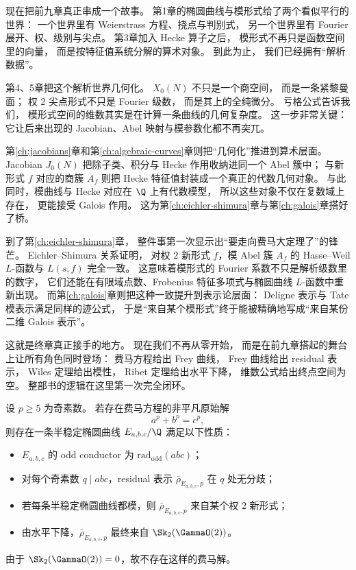 

现在把前九章真正串成一个故事。
第1章的椭圆曲线与模形式给了两个看似平行的世界：
一个世界里有 Weierstrass 方程、挠点与判别式，
另一个世界里有 Fourier 展开、权、级别与尖点。
第3章加入 Hecke 算子之后，
模形式不再只是函数空间里的向量，
而是按特征值系统分解的算术对象。
到此为止，
我们已经拥有“解析数据”。

第4、5章把这个解析世界几何化。
$X_0(N)$ 不只是一个商空间，
而是一条紧黎曼面；
权 $2$ 尖点形式不只是 Fourier 级数，
而是其上的全纯微分。
亏格公式告诉我们，
模形式空间的维数其实是在计算一条曲线的几何复杂度。
这一步非常关键：
它让后来出现的 Jacobian、Abel 映射与模参数化都不再突兀。

第\ref{ch:jacobians}章和第\ref{ch:algebraic-curves}章则把“几何化”推进到算术层面。
Jacobian $J_0(N)$ 把除子类、积分与 Hecke 作用收纳进同一个 Abel 簇中；
与新形式 $f$ 对应的商簇 $A_f$ 则把 Hecke 特征值封装成一个真正的代数几何对象。
与此同时，模曲线与 Hecke 对应在 $\Q$ 上有代数模型，
所以这些对象不仅在复数域上存在，
更能接受 Galois 作用。
这为第\ref{ch:eichler-shimura}章与第\ref{ch:galois}章搭好了桥。

到了第\ref{ch:eichler-shimura}章，
整件事第一次显示出“要走向费马大定理了”的锋芒。
Eichler--Shimura 关系证明，
对权 $2$ 新形式 $f$，模 Abel 簇 $A_f$ 的 Hasse--Weil $L$-函数与 $L(s,f)$ 完全一致。
这意味着模形式的 Fourier 系数不只是解析级数里的数字，
它们还能在有限域点数、Frobenius 特征多项式与椭圆曲线 $L$-函数中重新出现。
而第\ref{ch:galois}章则把这种一致提升到表示论层面：
Deligne 表示与 Tate 模表示满足同样的迹公式，
于是“来自某个模形式”终于能被精确地写成“来自某份二维 Galois 表示”。

这就是终章真正接手的地方。
现在我们不再从零开始，
而是在前九章搭起的舞台上让所有角色同时登场：
费马方程给出 Frey 曲线，
Frey 曲线给出 residual 表示，
Wiles 定理给出模性，
Ribet 定理给出水平下降，
维数公式给出终点空间为空。
整部书的逻辑在这里第一次完全闭环。

\begin{proposition}[终章的证明框架]
\label{prop:ch10-final-roadmap}
设 $p\ge 5$ 为奇素数。
若存在费马方程的非平凡原始解
\[
  a^p+b^p=c^p,
\]
则存在一条半稳定椭圆曲线 $E_{a,b,c}/\Q$ 满足以下性质：
\begin{itemize}
  \item[(i)] $E_{a,b,c}$ 的 odd conductor 为 $\mathrm{rad}_{\mathrm{odd}}(abc)$；
  \item[(ii)] 对每个奇素数 $q\mid abc$，residual 表示 $\bar\rho_{E_{a,b,c},p}$ 在 $q$ 处无分歧；
  \item[(iii)] 若每条半稳定椭圆曲线都模，则 $\bar\rho_{E_{a,b,c},p}$ 来自某个权 $2$ 新形式；
  \item[(iv)] 由水平下降，$\bar\rho_{E_{a,b,c},p}$ 最终来自 $\Sk_2(\GammaO(2))$。
\end{itemize}
由于 $\Sk_2(\GammaO(2))=0$，故不存在这样的费马解。
\end{proposition}

